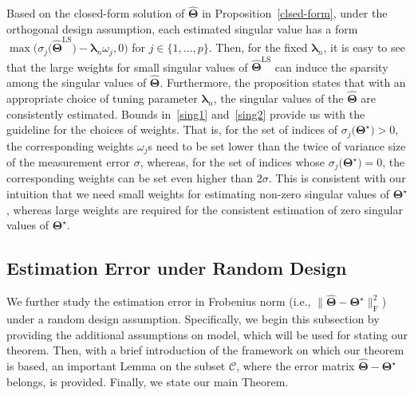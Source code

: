 \documentclass[alpha-refs]{wiley-article}
\begin{document}
Based on the closed-form solution of $\widehat{\boldsymbol{\Theta}}$ in Proposition~\ref{clsed-form}, under the orthogonal design assumption, each estimated singular value has a form $\max \big( \sigma_{j}\big(\widehat{\boldsymbol{\Theta}}^{\text{LS}}\big)-\boldsymbol{\lambda}_{n} \omega_{j},0 \big)$ for $j\in\{1,\dots,p\}$.
Then, for the fixed $\boldsymbol{\lambda}_{n}$, it is easy to see that the large weights for small singular values of $\widehat{\boldsymbol{\Theta}}^{\text{LS}}$ can induce the sparsity among the singular values of $\widehat{\boldsymbol{\Theta}}$.
Furthermore, the proposition states that with an appropriate choice of tuning parameter $\boldsymbol{\lambda}_{n}$, the singular values of the $\widehat{\boldsymbol{\Theta}}$ are consistently estimated.
Bounds in~\eqref{sing1} and~\eqref{sing2} provide us with the guideline for the choices of weights.
That is, for the set of indices of $\sigma_{j}\big(\boldsymbol{\Theta}^{\star}\big)>0$, the corresponding weights $\omega_{j}$s need to be set lower than the twice of variance size of the measurement error $\sigma$, whereas, for the set of indices whose $\sigma_{j}\big(\boldsymbol{\Theta}^{\star}\big)=0$, the corresponding weights can be set even higher than $2\sigma$.
This is consistent with our intuition that we need small weights for estimating non-zero singular values of $\boldsymbol{\Theta}^{\star}$, whereas large weights are required for the consistent estimation of zero singular values of $\boldsymbol{\Theta}^{\star}$.

\subsection{Estimation Error under Random Design}
We further study the estimation error in Frobenius norm (i.e., $\| \widehat{\boldsymbol{\Theta}} - \boldsymbol{\Theta^{\star}} \|_{\text{F}}^{2}$)  under a random design assumption.
Specifically, we begin this subsection by providing the additional assumptions on model, which will be used for stating our theorem.
Then, with a brief introduction of the framework on which our theorem is based, an important Lemma on the subset $\mathcal{C}$, where the error matrix $\widehat{\boldsymbol{\Theta}}-\boldsymbol{\Theta^{\star}}$ belongs, is provided.
Finally, we state our main Theorem.
\end{document}
